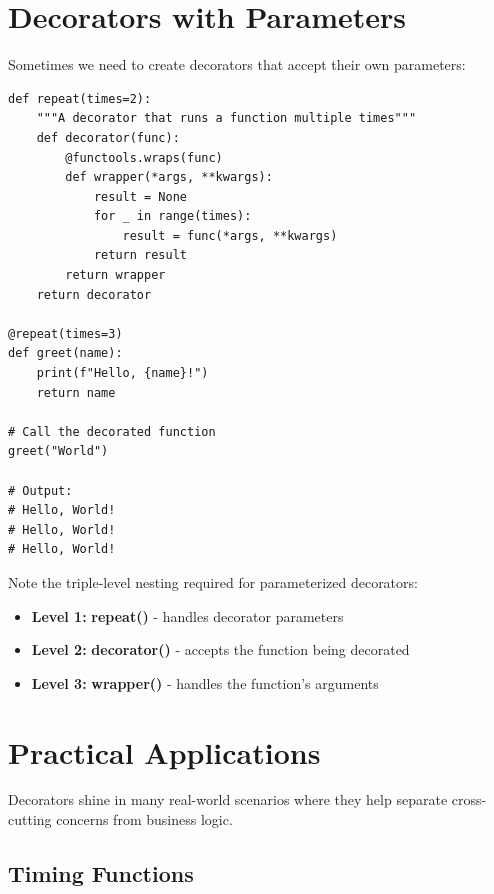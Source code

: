 \documentclass[12pt,letterpaper]{article}
\newenvironment{macterminal}{%
    \begin{mdframed}[
        linecolor=terminalFrame,
        backgroundcolor=terminalBg,
        roundcorner=5pt,
        skipabove=10pt,
        skipbelow=10pt,
        linewidth=1pt,
        innertopmargin=10pt, %
        frametitle={%
            \tikz[baseline=(current bounding box.east), outer sep=0pt]{
                \fill[red!80!black] (0,0) circle (5pt);
                \fill[yellow!80!black] (0.7,0) circle (5pt);
                \fill[green!70!black] (1.4,0) circle (5pt);
            }
        },
        frametitlealignment=\raggedright, %
        frametitleaboveskip=8pt, %
        frametitlebelowskip=0pt, %
    ]
}{%
    \end{mdframed}%
}
\begin{document}
\section{Decorators with Parameters}

Sometimes we need to create decorators that accept their own parameters:

\begin{macterminal}
\begin{lstlisting}
def repeat(times=2):
    """A decorator that runs a function multiple times"""
    def decorator(func):
        @functools.wraps(func)
        def wrapper(*args, **kwargs):
            result = None
            for _ in range(times):
                result = func(*args, **kwargs)
            return result
        return wrapper
    return decorator

@repeat(times=3)
def greet(name):
    print(f"Hello, {name}!")
    return name

# Call the decorated function
greet("World")

# Output:
# Hello, World!
# Hello, World!
# Hello, World!
\end{lstlisting}
\end{macterminal}

Note the triple-level nesting required for parameterized decorators:
\begin{itemize}
    \item \textbf{\textcolor{pythonBlue}{Level 1:}} \textbf{\textcolor{accentColor}{repeat()}} - handles decorator parameters
    \item \textbf{\textcolor{pythonBlue}{Level 2:}} \textbf{\textcolor{accentColor}{decorator()}} - accepts the function being decorated
    \item \textbf{\textcolor{pythonBlue}{Level 3:}} \textbf{\textcolor{accentColor}{wrapper()}} - handles the function's arguments
\end{itemize}

\section{Practical Applications}

Decorators shine in many real-world scenarios where they help separate cross-cutting concerns from business logic.

\subsection{Timing Functions}
\end{document}
